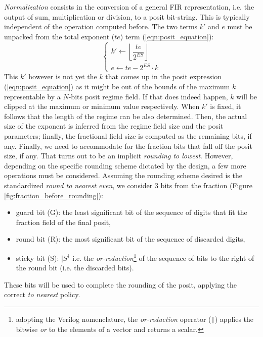 \textit{Normalization} consists in the conversion of a general FIR representation, i.e. the output of sum, multiplication or division, to a posit bit-string. This is typically independent of the operation computed before.
The two terms $k'$ and $e$ must be unpacked from the total exponent ($te$) term (\eqref{eqn:posit_equation}):
\begin{equation}\label{k_and_exp_from_totalexp}
\begin{cases}
    k' \leftarrow \left \lfloor \dfrac{te}{2^{ES}} \right \rfloor \\
    e \leftarrow te - 2^{ES} \cdot k
\end{cases}
\end{equation}
This $k'$ however is not yet the $k$ that comes up in the posit expression (\eqref{eqn:posit_equation}) as it might be out of the bounds of the maximum $k$ representable by a $N$-bits posit regime field. If that does indeed happen, $k$ will be clipped at the maximum or minimum value respectively.
When $k'$ is fixed, it follows that the length of the regime can be also determined. Then, the actual size of the exponent is inferred from the regime field size and the posit parameters; finally, the fractional field size is computed as the remaining bits, if any.
Finally, we need to accommodate for the fraction bits that fall off the posit size, if any. That turns out to be an implicit \textit{rounding to lowest}.
However, depending on the specific rounding scheme dictated by the design, a few more operations must be considered.
Assuming the rounding scheme desired is the standardized \textit{round to nearest even}, we consider 3 bits from the fraction  (Figure \ref{fig:fraction_before_rounding}):
\begin{itemize}
\item guard bit (G): the least significant bit of the sequence of digits that fit the fraction field of the final posit,
\item round bit (R): the most significant bit of the sequence of discarded digits,
\item sticky bit (S): $|S^{\dagger}$ i.e. the \textit{or-reduction}\footnote{adopting the Verilog nomenclature, the \textit{or-reduction} operator (\texttt{|}) applies the bitwise \textit{or} to the elements of a vector and returns a scalar.
} of the sequence of bits to the right of the round bit (i.e. the discarded bits).
\end{itemize}
These bits will be used to complete the rounding of the posit, applying the correct \textit{to nearest} policy.




